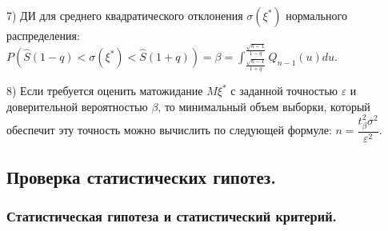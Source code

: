 \documentclass[9pt]{article}
\begin{document}
\par7) ДИ для среднего квадратического отклонения \(\sigma(\xi^*)\) нормального распределения: \(P(\hat{S}(1-q)<\sigma(\xi^*)<\hat{S}(1+q))=\beta=\int_{\frac{\sqrt{n-1}}{1+q}}^{\frac{\sqrt{n-1}}{1-q}}Q_{n-1}(u)du\).
\par8) Если требуется оценить матожидание \(M\xi^*\) с заданной точностью \(\varepsilon\) и доверительной вероятностью \(\beta\), то минимальный объем выборки, который обеспечит эту точность можно вычислить по следующей формуле: \(n=\dfrac{t_\beta^2\sigma^2}{\varepsilon^2}\).

\subsection{Проверка статистических гипотез.}

\subsubsection{Статистическая гипотеза и статистический критерий.}
\end{document}
